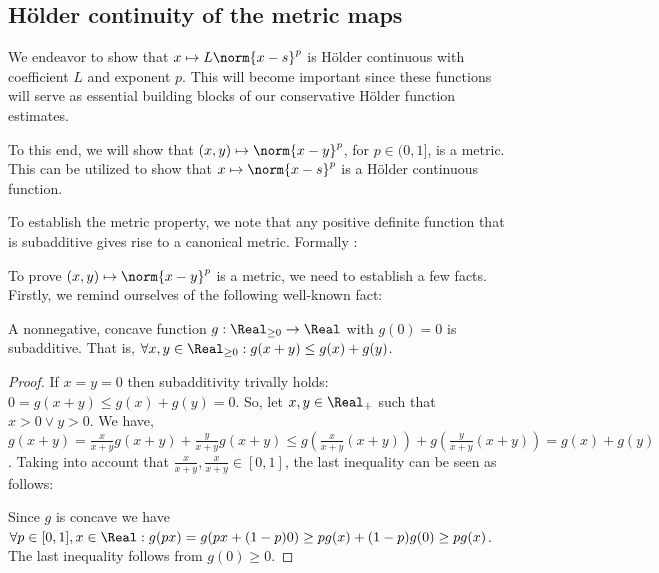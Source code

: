 

\subsection{H\"older continuity of the metric maps}

 
We endeavor to show that $x \mapsto L \norm{ x -s}^p$ is H\"older continuous with coefficient $L$ and exponent $p$. This will become important since these functions will serve as essential building blocks of our conservative H\"older function estimates. 

To this end, we will show that $(x,y) \mapsto \norm{x-y}^p$, for $p \in (0,1] $, is a metric.  This can be utilized to show that
$x \mapsto \norm{ x -s}^p$ is a H\"older continuous function.

To establish the metric property, we note that any positive definite function that is subadditive gives rise to a canonical metric. Formally :


To prove $(x,y) \mapsto \norm{x-y}^p$ is a metric, we need to establish a few facts. 
Firstly, we remind ourselves of the following well-known fact:
\begin{lem} \label{lem:pd_n_concave_subadditive}
 A nonnegative, concave function $g:\Real_{\geq 0} \to \Real$ with $g(0) = 0$ is subadditive. 
 That is, $\forall x,y \in \Real_{\geq 0}: g(x+y) \leq g(x) + g(y)$. 
 
 \begin{proof}
If $x = y = 0$ then subadditivity trivally holds:  $0=g(x+y) \leq g(x) + g(y) = 0$.
So, let $x, y \in \Real_+$ such that $x >0 \vee y >0$.
We have, $g( x +y) = \frac{x}{x+y} g(x+y) + \frac{y}{x+y} g(x+y) \leq g(\frac{x}{x+y} (x+y) ) +  g(\frac{y}{x+y}(x+y)) = g(x) + g(y)$.
Taking into account that $\frac{x}{x+y}, \frac{x}{x+y} \in [0,1]$, the last inequality can be seen as follows:

 Since $g$ is concave we have 
$\forall p \in [0,1], x \in \Real: g(p x) =  g(px + (1-p) 0) \geq p g(x) + (1-p) g(0) \geq p g(x)  $. The last inequality follows from $g(0) \geq 0$.
\end{proof}
\end{lem}

